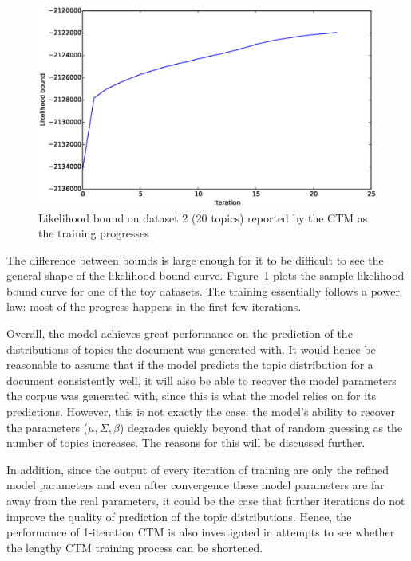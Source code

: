 \documentclass[12pt,a4paper,twoside,openright]{report}
\begin{document}
\begin{figure}[!htb]
\includegraphics[width=\textwidth]{sim-likelihood-bounds-k-20.eps}
\caption{Likelihood bound on dataset 2 (20 topics) reported by the CTM as the training progresses}
\label{fig:sim-likelihood-bounds-k-20}
\end{figure}

The difference between bounds is large enough for it to be difficult to see the general shape of the likelihood bound curve. Figure~\ref{fig:sim-likelihood-bounds-k-20} plots the sample likelihood bound curve for one of the toy datasets. The training essentially follows a power law: most of the progress happens in the first few iterations.

Overall, the model achieves great performance on the prediction of the distributions of topics the document was generated with. It would hence be reasonable to assume that if the model predicts the topic distribution for a document consistently well, it will also be able to recover the model parameters the corpus was generated with, since this is what the model relies on for its predictions. However, this is not exactly the case: the model's ability to recover the parameters ($\mu, \Sigma, \beta$) degrades quickly beyond that of random guessing as the number of topics increases. The reasons for this will be discussed further.

In addition, since the output of every iteration of training are only the refined model parameters and even after convergence these model parameters are far away from the real parameters, it could be the case that further iterations do not improve the quality of prediction of the topic distributions. Hence, the performance of 1-iteration CTM is also investigated in attempts to see whether the lengthy CTM training process can be shortened.
\end{document}
